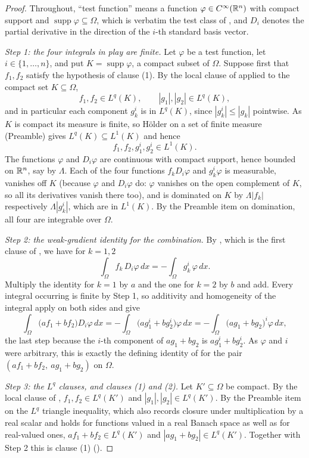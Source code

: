 \begin{proof}
Throughout, ``test function'' means a function $\varphi\in C^\infty(\mathbb{R}^n)$ with
compact support and $\operatorname{supp}\varphi\subseteq\Omega$, which is
verbatim the test class of , and $D_i$ denotes the
partial derivative in the direction of the $i$-th standard basis vector.

\emph{Step 1: the four integrals in play are finite.}  Let $\varphi$ be a test
function, let $i\in\{1,\dots,n\}$, and put $K=\operatorname{supp}\varphi$, a
compact subset of $\Omega$.  Suppose first that $f_1,f_2$ satisfy the hypothesis
of clause (1).  By the local clause of  applied to the
compact set $K\subseteq\Omega$,
\[
f_1,f_2\in L^q(K),\qquad |g_1|,|g_2|\in L^q(K),
\]
and in particular each component $g_k^i$ is in $L^q(K)$, since
$|g_k^i|\le|g_k|$ pointwise.  As $K$ is compact its measure is finite, so
H\"older on a set of finite measure (Preamble) gives
$L^q(K)\subseteq L^1(K)$ and hence
\[
f_1,f_2,g_1^i,g_2^i\in L^1(K).
\]
The functions $\varphi$ and $D_i\varphi$ are continuous with compact support,
hence bounded on $\mathbb{R}^n$, say by $\Lambda$.  Each of the four functions
$f_kD_i\varphi$ and $g_k^i\varphi$ is measurable, vanishes off $K$ (because
$\varphi$ and $D_i\varphi$ do: $\varphi$ vanishes on the open complement of $K$,
so all its derivatives vanish there too), and is dominated on $K$ by
$\Lambda|f_k|$ respectively $\Lambda|g_k^i|$, which are in $L^1(K)$.  By the
Preamble item on domination, all four are integrable over $\Omega$.

\emph{Step 2: the weak-gradient identity for the combination.}  By
, which is the first clause of
, we have for $k=1,2$
\[
\int_\Omega f_k\,D_i\varphi\,dx=-\int_\Omega g_k^i\,\varphi\,dx .
\]
Multiply the identity for $k=1$ by $a$ and the one for $k=2$ by $b$ and add.
Every integral occurring is finite by Step 1, so additivity and homogeneity of
the integral apply on both sides and give
\[
\int_\Omega\bigl(af_1+bf_2\bigr)D_i\varphi\,dx
=-\int_\Omega\bigl(ag_1^i+bg_2^i\bigr)\varphi\,dx
=-\int_\Omega\bigl(ag_1+bg_2\bigr)^i\varphi\,dx ,
\]
the last step because the $i$-th component of $ag_1+bg_2$ is $ag_1^i+bg_2^i$.
As $\varphi$ and $i$ were arbitrary, this is exactly the defining identity of
 for the pair $(af_1+bf_2,\ ag_1+bg_2)$ on $\Omega$.

\emph{Step 3: the $L^q$ clauses, and clauses (1) and (2).}  Let
$K'\subseteq\Omega$ be compact.  By the local clause of ,
$f_1,f_2\in L^q(K')$ and $|g_1|,|g_2|\in L^q(K')$.  By the Preamble item on the
$L^q$ triangle inequality, which also records closure under multiplication by a
real scalar and holds for functions valued in a real Banach space as well as for
real-valued ones, $af_1+bf_2\in L^q(K')$ and $|ag_1+bg_2|\in L^q(K')$.  Together
with Step 2 this is clause (1) ().


\end{proof}
